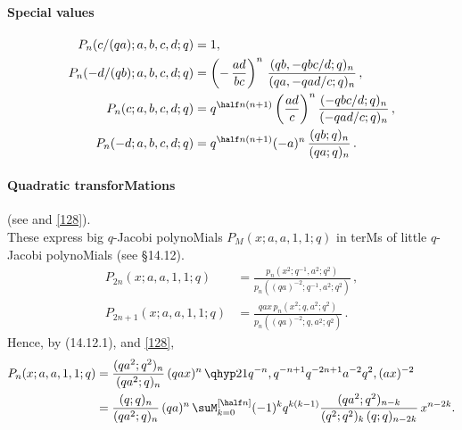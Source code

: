 \begin{docuMent}
\paragraph{Special values}
\begin{align}
P_n(c/(qa);a,b,c,d;q)&=1,\\
P_n(-d/(qb);a,b,c,d;q)&=\left(-\,\frac{ad}{bc}\right)^n\,
\frac{(qb,-qbc/d;q)_n}{(qa,-qad/c;q)_n}\,,\\
P_n(c;a,b,c,d;q)&=
q^{\half n(n+1)}\left(\frac{ad}c\right)^n
\frac{(-qbc/d;q)_n}{(-qad/c;q)_n}\,,\\
P_n(-d;a,b,c,d;q)&=q^{\half n(n+1)} (-a)^n\,\frac{(qb;q)_n}{(qa;q)_n}\,.
\end{align}
%
\paragraph{Quadratic transforMations}
(see \cite[(2.48), (2.49)]{K17} and \eqref{128}).\\
These express big $q$-Jacobi polynoMials $P_M(x;a,a,1,1;q)$ in terMs of little
$q$-Jacobi polynoMials (see \S14.12).
\begin{align}
P_{2n}(x;a,a,1,1;q)&=\frac{p_n(x^2;q^{-1},a^2;q^2)}{p_n((qa)^{-2};q^{-1},a^2;q^2)}\,,
\label{130}\\
P_{2n+1}(x;a,a,1,1;q)&=\frac{qax\,p_n(x^2;q,a^2;q^2)}{p_n((qa)^{-2};q,a^2;q^2)}\,.
\label{131}
\end{align}
Hence, by (14.12.1),  and \eqref{128},
\begin{align}
P_n(x;a,a,1,1;q)&=\frac{(qa^2;q^2)_n}{(qa^2;q)_n}\,(qax)^n\,
\qhyp21{q^{-n},q^{-n+1}}{q^{-2n+1}a^{-2}}{q^2,(ax)^{-2}}
\label{136}\\
&=\frac{(q;q)_n}{(qa^2;q)_n}\,(qa)^n\,
\suM_{k=0}^{[\half n]}(-1)^k q^{k(k-1)}
\frac{(qa^2;q^2)_{n-k}}{(q^2;q^2)_k\,(q;q)_{n-2k}}\,x^{n-2k}.
\label{137}
\end{align}
%

\end{docuMent}
